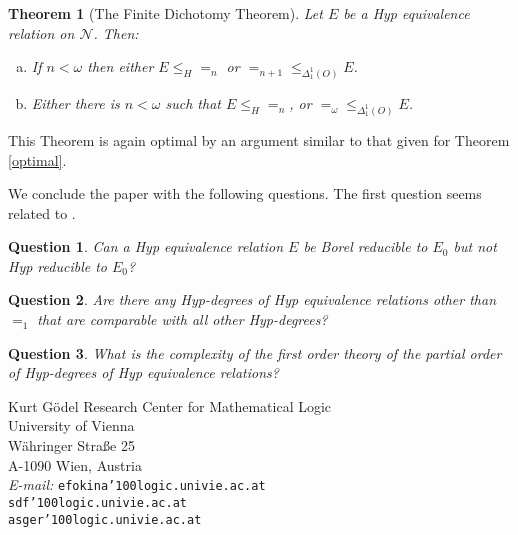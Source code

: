 \documentclass[11pt, english]{article}
\newtheorem{thm}{Theorem}
\newtheorem{quest}{Question}
\newcommand{\at}{\char'100}
\newcommand{\baire}{\mathscr N}
\begin{document}
\begin{thm}[The Finite Dichotomy Theorem] Let $E$ be a Hyp
equivalence relation on $\baire$. Then:
\begin{enumerate}[(a)]
\item If $n<\omega$ then either $E\leq_{H} =_n$ or
$=_{n+1}\leq_{\Delta^1_1(O)} E$.

\item Either there is $n<\omega$ such that $E\leq_{H}
=_n$, or $=_{\omega}\leq_{\Delta^1_1(O)} E$.
\end{enumerate}
\end{thm}
This Theorem is again optimal by an argument similar to that given
for Theorem \ref{optimal}.

\medskip

We conclude the paper with the following questions. The first
question seems related to \cite[Question 6.1.B]{jakelo02}.

\begin{quest}
 Can a Hyp equivalence relation $E$ be Borel reducible to $E_0$ but not Hyp reducible to $E_0$?
\end{quest}



\begin{quest}
 Are there any Hyp-degrees of Hyp equivalence relations other than $=_1$ that are comparable with all other Hyp-degrees?
\end{quest}

\begin{quest}
 What is the complexity of the first order theory of the partial order of Hyp-degrees of Hyp equivalence relations?
\end{quest}







\parbox{4.7in}{
{\sc
\noindent
Kurt G\"{o}del Research Center for Mathematical Logic \hfill \\
\hspace*{.1in}  University of Vienna \hfill \\
\hspace*{.2in}  W\"{a}hringer Stra{\ss}e 25 \hfill\\
\hspace*{.3in}  A-1090 Wien, Austria \hfill}\\
\hspace*{.045in} {\it E-mail: } \texttt{efokina\at {logic.univie.ac.at} }\hfill \\
\hspace*{.68in} \texttt{sdf\at {logic.univie.ac.at} }\hfill \\
\hspace*{.68in} \texttt{asger\at {logic.univie.ac.at}}\hfill

}
\end{document}
